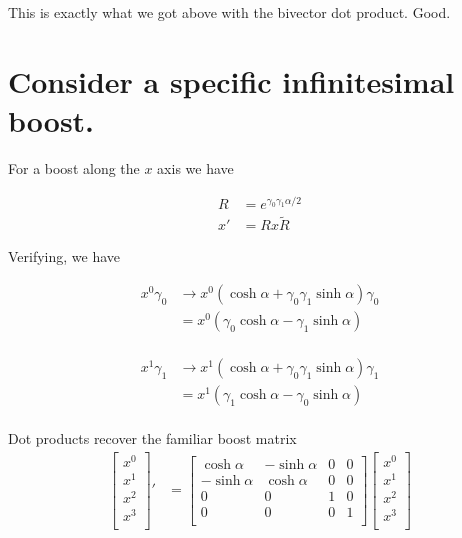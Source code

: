 This is exactly what we got above with the bivector dot product.  Good.

\section{Consider a specific infinitesimal boost.}

For a boost along the $x$ axis we have

\begin{align}
R &= e^{\gamma_0\gamma_1 \alpha/2} \\
x' &= R x \tilde{R}
\end{align}

Verifying, we have

\begin{align*}
x^0 \gamma_0 
&\rightarrow x^0 ( \cosh\alpha + \gamma_0 \gamma_1 \sinh\alpha ) \gamma_0 \\
&= x^0 ( \gamma_0 \cosh\alpha - \gamma_1 \sinh\alpha ) \\
\end{align*}

\begin{align*}
x^1 \gamma_1 
&\rightarrow x^1 ( \cosh\alpha + \gamma_0 \gamma_1 \sinh\alpha ) \gamma_1 \\
&= x^1 ( \gamma_1 \cosh\alpha - \gamma_0 \sinh\alpha ) \\
\end{align*}

Dot products recover the familiar boost matrix
\begin{align*}
\begin{bmatrix}
x^0 \\
x^1 \\
x^2 \\
x^3 \\
\end{bmatrix}'
&=
\begin{bmatrix}
\cosh\alpha & -\sinh\alpha & 0 & 0 \\
-\sinh\alpha & \cosh\alpha & 0 & 0 \\
0 & 0 & 1 & 0 \\
0 & 0 & 0 & 1 \\
\end{bmatrix}
\begin{bmatrix}
x^0 \\
x^1 \\
x^2 \\
x^3 \\
\end{bmatrix}
\end{align*}

